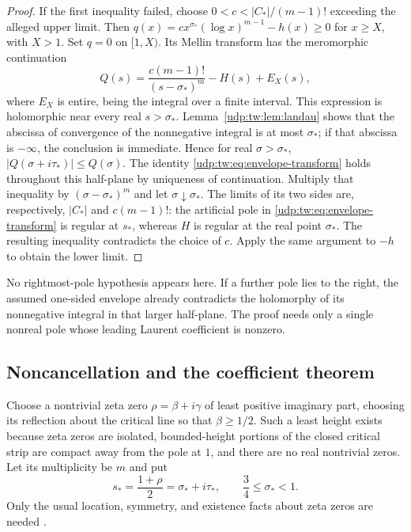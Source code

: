 \documentclass[11pt]{article}
\theoremstyle{remark}\newtheorem{remark}[theorem]{Remark}
\numberwithin{equation}{section}
\begin{document}
\begin{proof}
If the first inequality failed, choose
$0<c<|C_*|/(m-1)!$ exceeding the alleged upper limit.
Then $q(x)=cx^{\sigma_*}(\log x)^{m-1}-h(x)\ge0$ for $x\ge X$,
with $X>1$. Set $q=0$ on $[1,X)$. Its Mellin transform has the
meromorphic continuation
\begin{equation}
 Q(s)=\frac{c(m-1)!}{(s-\sigma_*)^m}-H(s)+E_X(s),
 \label{udp:tw:eq:envelope-transform}
\end{equation}
where $E_X$ is entire, being the integral over a finite interval.
This expression is holomorphic near every real $s>\sigma_*$.
Lemma~\ref{udp:tw:lem:landau} shows that the abscissa of convergence of
the nonnegative integral is at most $\sigma_*$; if that abscissa is
$-\infty$, the conclusion is immediate.
Hence for real $\sigma>\sigma_*$,
$|Q(\sigma+i\tau_*)|\le Q(\sigma)$.
The identity \eqref{udp:tw:eq:envelope-transform} holds throughout this
half-plane by uniqueness of continuation.
Multiply that inequality by $(\sigma-\sigma_*)^m$ and let
$\sigma\downarrow\sigma_*$. The limits of its two sides are,
respectively, $|C_*|$ and $c(m-1)!$:
the artificial pole in \eqref{udp:tw:eq:envelope-transform} is regular
at $s_*$, whereas $H$ is regular at the real point $\sigma_*$.
The resulting inequality contradicts the choice of $c$.
Apply the same argument to $-h$ to obtain the lower limit.
\end{proof}

No rightmost-pole hypothesis appears here. If a further pole lies to
the right, the assumed one-sided envelope already contradicts the
holomorphy of its nonnegative integral in that larger half-plane.
The proof needs only a single nonreal pole whose leading Laurent
coefficient is nonzero.

\subsection{Noncancellation and the coefficient theorem}

Choose a nontrivial zeta zero $\rho=\beta+i\gamma$ of least positive
imaginary part, choosing its reflection about the critical line so
that $\beta\ge1/2$. Such a least height exists because zeta zeros are
isolated, bounded-height portions of the closed critical strip are
compact away from the pole at $1$, and there are no real nontrivial
zeros. Let its multiplicity be $m$ and put
\begin{equation}
 s_*=\frac{1+\rho}{2}=\sigma_*+i\tau_*,
 \qquad \frac34\le\sigma_*<1.
 \label{udp:tw:eq:selected-zero}
\end{equation}
Only the usual location, symmetry, and existence facts about zeta
zeros are needed \cite{dlmf}.
\end{document}
